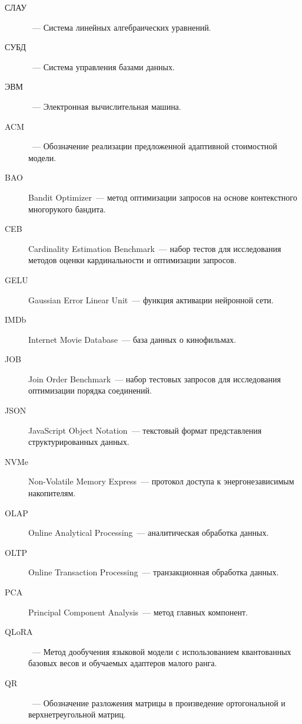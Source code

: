 \begin{description}

\item[СЛАУ]~--- Система линейных алгебраических уравнений.

\item[СУБД]~--- Система управления базами данных.

\item[ЭВМ]~--- Электронная вычислительная машина.

\item[ACM]~--- Обозначение реализации предложенной
адаптивной стоимостной модели.

\item[BAO] Bandit Optimizer~--- метод оптимизации запросов
на основе контекстного многорукого бандита.

\item[CEB] Cardinality Estimation Benchmark~--- набор тестов
для исследования методов оценки кардинальности
и оптимизации запросов.

\item[GELU] Gaussian Error Linear Unit~--- функция активации
нейронной сети.

\item[IMDb] Internet Movie Database~--- база данных
о кинофильмах.

\item[JOB] Join Order Benchmark~--- набор тестовых запросов
для исследования оптимизации порядка соединений.

\item[JSON] JavaScript Object Notation~--- текстовый формат
представления структурированных данных.

\item[NVMe] Non-Volatile Memory Express~--- протокол доступа
к энергонезависимым накопителям.

\item[OLAP] Online Analytical Processing~--- аналитическая
обработка данных.

\item[OLTP] Online Transaction Processing~--- транзакционная
обработка данных.

\item[PCA] Principal Component Analysis~--- метод главных
компонент.

\item[QLoRA]~--- Метод дообучения языковой модели
с использованием квантованных базовых весов
и обучаемых адаптеров малого ранга.

\item[QR]~--- Обозначение разложения матрицы в произведение
ортогональной и верхнетреугольной матриц.


\end{description}
